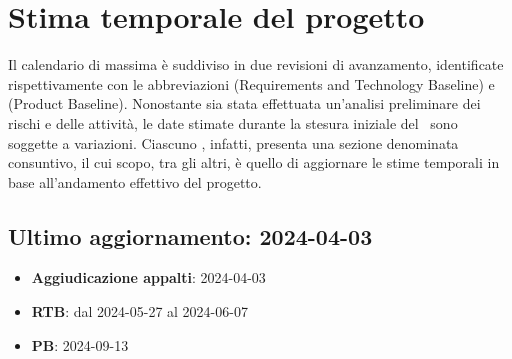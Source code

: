 \section{Stima temporale del progetto}
\label{sec:stima_temporale}

\par Il calendario di massima è suddiviso in due revisioni di avanzamento, identificate rispettivamente con le abbreviazioni  (Requirements and Technology Baseline) e  (Product Baseline). Nonostante sia stata effettuata un'analisi preliminare dei rischi e delle attività, le date stimate durante la stesura iniziale del \PdP\ sono soggette a variazioni. Ciascuno , infatti, presenta una sezione denominata consuntivo, il cui scopo, tra gli altri, è quello di aggiornare le stime temporali in base all'andamento effettivo del progetto.

\subsection{Ultimo aggiornamento: 2024-04-03}
\begin{itemize}
  \item \textbf{Aggiudicazione appalti}: 2024-04-03
  \item \textbf{RTB}: dal 2024-05-27 al 2024-06-07
  \item \textbf{PB}: 2024-09-13
\end{itemize}
